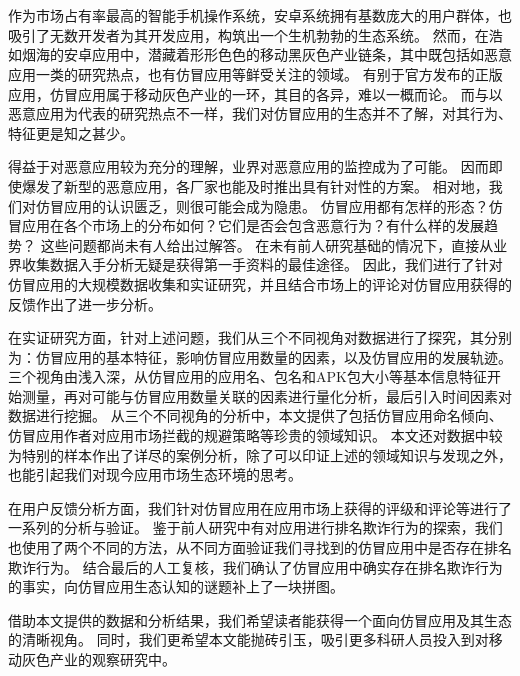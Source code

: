 
\chapter*{}
\vspace{-5mm}

\setlength{\baselineskip}{25pt} %

作为市场占有率最高的智能手机操作系统，安卓系统拥有基数庞大的用户群体，也吸引了无数开发者为其开发应用，构筑出一个生机勃勃的生态系统。
然而，在浩如烟海的安卓应用中，潜藏着形形色色的移动黑灰色产业链条，其中既包括如恶意应用一类的研究热点，也有仿冒应用等鲜受关注的领域。
有别于官方发布的正版应用，仿冒应用属于移动灰色产业的一环，其目的各异，难以一概而论。
而与以恶意应用为代表的研究热点不一样，我们对仿冒应用的生态并不了解，对其行为、特征更是知之甚少。

得益于对恶意应用较为充分的理解，业界对恶意应用的监控成为了可能。
因而即使爆发了新型的恶意应用，各厂家也能及时推出具有针对性的方案。
相对地，我们对仿冒应用的认识匮乏，则很可能会成为隐患。
仿冒应用都有怎样的形态？仿冒应用在各个市场上的分布如何？它们是否会包含恶意行为？有什么样的发展趋势？
这些问题都尚未有人给出过解答。
在未有前人研究基础的情况下，直接从业界收集数据入手分析无疑是获得第一手资料的最佳途径。
因此，我们进行了针对仿冒应用的大规模数据收集和实证研究，并且结合市场上的评论对仿冒应用获得的反馈作出了进一步分析。

在实证研究方面，针对上述问题，我们从三个不同视角对数据进行了探究，其分别为：仿冒应用的基本特征，影响仿冒应用数量的因素，以及仿冒应用的发展轨迹。
三个视角由浅入深，从仿冒应用的应用名、包名和APK包大小等基本信息特征开始测量，再对可能与仿冒应用数量关联的因素进行量化分析，最后引入时间因素对数据进行挖掘。
从三个不同视角的分析中，本文提供了包括仿冒应用命名倾向、仿冒应用作者对应用市场拦截的规避策略等珍贵的领域知识。
本文还对数据中较为特别的样本作出了详尽的案例分析，除了可以印证上述的领域知识与发现之外，也能引起我们对现今应用市场生态环境的思考。

在用户反馈分析方面，我们针对仿冒应用在应用市场上获得的评级和评论等进行了一系列的分析与验证。
鉴于前人研究中有对应用进行排名欺诈行为的探索，我们也使用了两个不同的方法，从不同方面验证我们寻找到的仿冒应用中是否存在排名欺诈行为。
结合最后的人工复核，我们确认了仿冒应用中确实存在排名欺诈行为的事实，向仿冒应用生态认知的谜题补上了一块拼图。

借助本文提供的数据和分析结果，我们希望读者能获得一个面向仿冒应用及其生态的清晰视角。
同时，我们更希望本文能抛砖引玉，吸引更多科研人员投入到对移动灰色产业的观察研究中。

 
